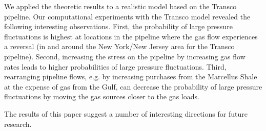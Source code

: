 \documentclass[10pt, conference, compsocconf]{IEEEtran}
\begin{document}
We applied the theoretic results to a realistic model based on the Transco pipeline. Our computational experiments with the Transco model revealed the following interesting observations.  First, the probability of large pressure fluctuations is highest at locations in the pipeline where the gas flow experiences a reversal  (in and around the New York/New Jersey area for the Transco pipeline).  Second, increasing the stress on the pipeline by increasing gas flow rates leads to higher probabilities of large pressure fluctuations.  Third, rearranging pipeline flows, e.g. by increasing purchases from the Marcellus Shale at the expense of gas from the Gulf, can decrease the probability of large pressure fluctuations by moving the gas sources closer to the gas loads.

The results of this paper suggest a number of interesting directions for future research.
\end{document}
